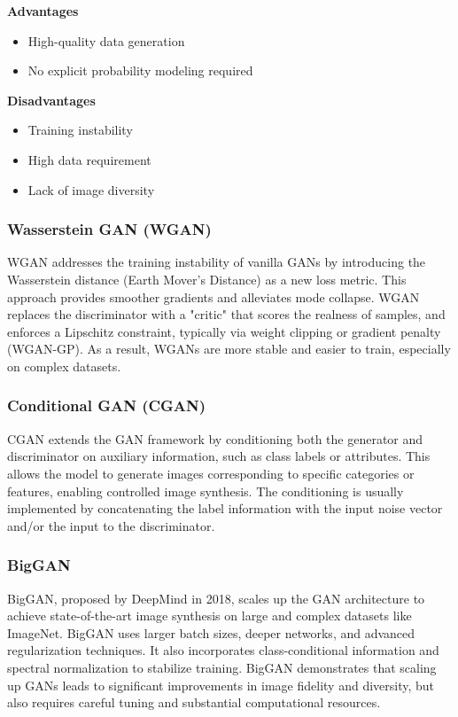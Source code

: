 \documentclass{article}
\begin{document}
\textbf{Advantages}
\begin{itemize}
    \item High-quality data generation
    \item No explicit probability modeling required
\end{itemize}

\textbf{Disadvantages}
\begin{itemize}
    \item Training instability
    \item High data requirement
    \item Lack of image diversity
\end{itemize}

\subsubsection{Wasserstein GAN (WGAN)}
WGAN addresses the training instability of vanilla GANs by introducing the Wasserstein distance (Earth Mover's Distance) as a new loss metric. This approach provides smoother gradients and alleviates mode collapse. WGAN replaces the discriminator with a "critic" that scores the realness of samples, and enforces a Lipschitz constraint, typically via weight clipping or gradient penalty (WGAN-GP). As a result, WGANs are more stable and easier to train, especially on complex datasets.

\subsubsection{Conditional GAN (CGAN)}
CGAN extends the GAN framework by conditioning both the generator and discriminator on auxiliary information, such as class labels or attributes. This allows the model to generate images corresponding to specific categories or features, enabling controlled image synthesis. The conditioning is usually implemented by concatenating the label information with the input noise vector and/or the input to the discriminator.

\subsubsection{BigGAN}
BigGAN, proposed by DeepMind in 2018, scales up the GAN architecture to achieve state-of-the-art image synthesis on large and complex datasets like ImageNet. BigGAN uses larger batch sizes, deeper networks, and advanced regularization techniques. It also incorporates class-conditional information and spectral normalization to stabilize training. BigGAN demonstrates that scaling up GANs leads to significant improvements in image fidelity and diversity, but also requires careful tuning and substantial computational resources.
\end{document}
